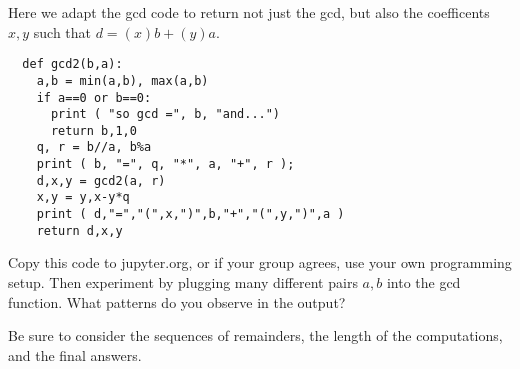 \documentclass[12pt]{exam}
\begin{document}
\begin{questions}
  \question Here we adapt the gcd code to return not just the gcd, but also the coefficents $x,y$ such that $d=(x)b+(y)a$.
  \begin{lstlisting}
  def gcd2(b,a):
    a,b = min(a,b), max(a,b)
    if a==0 or b==0:
      print ( "so gcd =", b, "and...")
      return b,1,0
    q, r = b//a, b%a
    print ( b, "=", q, "*", a, "+", r );
    d,x,y = gcd2(a, r)
    x,y = y,x-y*q
    print ( d,"=","(",x,")",b,"+","(",y,")",a )
    return d,x,y
  \end{lstlisting}
  Copy this code to jupyter.org, or if your group agrees, use your own programming setup. Then experiment by plugging many different pairs $a,b$ into the gcd function. What patterns do you observe in the output?
  
  Be sure to consider the sequences of remainders, the length of the computations, and the final answers.
  \newpage
  \question 
\end{questions}
\end{document}
